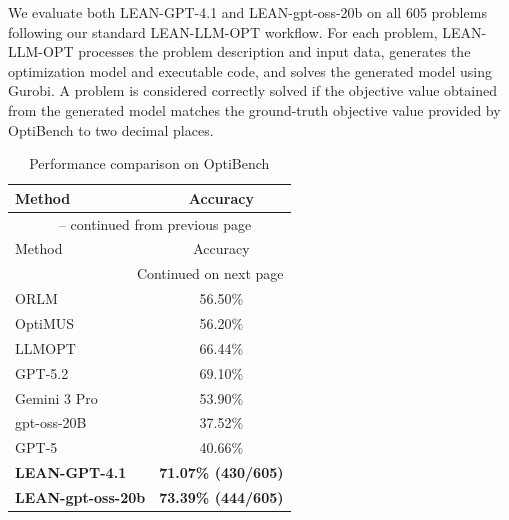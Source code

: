 \documentclass[11pt]{article}
\begin{document}
\begin{enumerate}[label=(R2.Major.\arabic*),leftmargin=*]
We evaluate both LEAN-GPT-4.1 and LEAN-gpt-oss-20b on all 605 problems following our standard LEAN-LLM-OPT workflow. For each problem, LEAN-LLM-OPT processes the problem description and input data, generates the optimization model and executable code, and solves the generated model using Gurobi. A problem is considered correctly solved if the objective value obtained from the generated model matches the ground-truth objective value provided by OptiBench to two decimal places.


\begin{longtable}{lc}
\caption{Performance comparison on OptiBench}
\label{tab:optibench_results} \\

\toprule
Method & Accuracy \\
\midrule
\endfirsthead

\multicolumn{2}{c}{
\tablename\ \thetable{} -- continued from previous page
} \\
\toprule
Method & Accuracy \\
\midrule
\endhead

\midrule
\multicolumn{2}{r}{Continued on next page} \\
\endfoot

\bottomrule
\endlastfoot

ORLM \citep{ding2026or}
& 56.50\% \\

OptiMUS \citep{zhang2026dual}
& 56.20\% \\

LLMOPT \citep{shu2025llmopt}
& 66.44\% \\

GPT-5.2 \citep{shen2026proopf}
& 69.10\% \\

Gemini 3 Pro \citep{shen2026proopf}
& 53.90\% \\

gpt-oss-20B \citep{team2025every}
& 37.52\% \\

GPT-5 \citep{team2025every}
& 40.66\% \\

\midrule

\textbf{LEAN-GPT-4.1}
& \textbf{71.07\% (430/605)} \\

\textbf{LEAN-gpt-oss-20b}
& \textbf{73.39\% (444/605)} \\

\end{longtable}



\end{enumerate}
\end{document}

